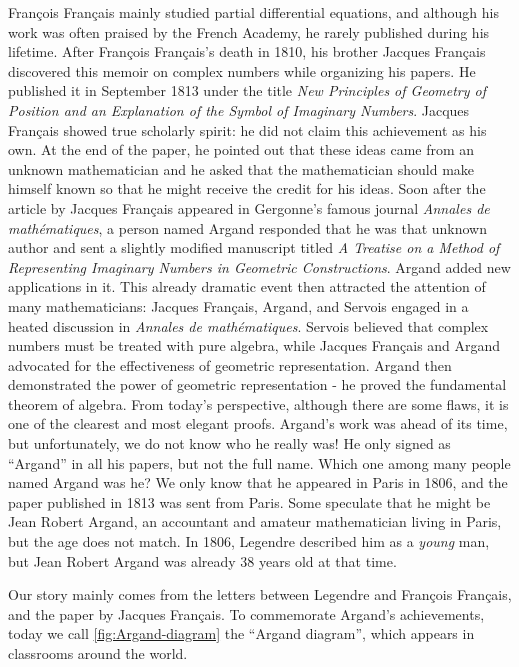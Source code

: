 \documentclass[b5paper]{article}
\begin{document}
François Français mainly studied partial differential equations, and although his work was often praised by the French Academy, he rarely published during his lifetime. After François Français's death in 1810, his brother Jacques Français discovered this memoir on complex numbers while organizing his papers. He published it in September 1813 under the title \emph{New Principles of Geometry of Position and an Explanation of the Symbol of Imaginary Numbers}. Jacques Français showed true scholarly spirit: he did not claim this achievement as his own. At the end of the paper, he pointed out that these ideas came from an unknown mathematician and he asked that the mathematician should make himself known so that he might receive the credit for his ideas. Soon after the article by Jacques Français appeared in Gergonne's famous journal \emph{Annales de mathématiques}, a person named Argand responded that he was that unknown author and sent a slightly modified manuscript titled \emph{A Treatise on a Method of Representing Imaginary Numbers in Geometric Constructions}. Argand added new applications in it. This already dramatic event then attracted the attention of many mathematicians: Jacques Français, Argand, and Servois engaged in a heated discussion in \emph{Annales de mathématiques}. Servois believed that complex numbers must be treated with pure algebra, while Jacques Français and Argand advocated for the effectiveness of geometric representation. Argand then demonstrated the power of geometric representation - he proved the fundamental theorem of algebra. From today's perspective, although there are some flaws, it is one of the clearest and most elegant proofs. Argand's work was ahead of its time, but unfortunately, we do not know who he really was! He only signed as \enquote{Argand} in all his papers, but not the full name. Which one among many people named Argand was he? We only know that he appeared in Paris in 1806, and the paper published in 1813 was sent from Paris. Some speculate that he might be Jean Robert Argand, an accountant and amateur mathematician living in Paris, but the age does not match. In 1806, Legendre described him as a \emph{young} man, but Jean Robert Argand was already 38 years old at that time\cite{MacTour-Argand}.

Our story mainly comes from the letters between Legendre and François Français, and the paper by Jacques Français. To commemorate Argand's achievements, today we call \cref{fig:Argand-diagram} the \enquote{Argand diagram}, which appears in classrooms around the world\cite{Weisstein-2025}.
\end{document}
